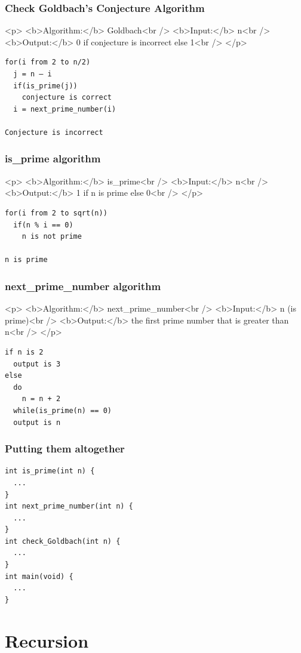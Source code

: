 \documentclass{../c-lecture}
\begin{document}
\begin{frame}
  \frametitle{Check Goldbach’s Conjecture Algorithm}
  <p>
    <b>Algorithm:</b> Goldbach<br />
    <b>Input:</b> n<br />
    <b>Output:</b> 0 if conjecture is incorrect else 1<br />
  </p>
  \begin{verbatim}
for(i from 2 to n/2)
  j = n – i
  if(is_prime(j))
    conjecture is correct
  i = next_prime_number(i)

Conjecture is incorrect
  \end{verbatim}
\end{frame}

\begin{frame}
  \frametitle{is_prime algorithm}
  <p>
    <b>Algorithm:</b> is_prime<br />
    <b>Input:</b> n<br />
    <b>Output:</b> 1 if n is prime else 0<br />
  </p>
  \begin{verbatim}
for(i from 2 to sqrt(n))
  if(n % i == 0)
    n is not prime

n is prime
  \end{verbatim}
\end{frame}

\begin{frame}[fragile]
  \frametitle{next_prime_number algorithm}
  <p>
    <b>Algorithm:</b> next_prime_number<br />
    <b>Input:</b> n (is prime)<br />
    <b>Output:</b> the first prime number that is greater than n<br />
  </p>
  \begin{verbatim}
if n is 2
  output is 3
else
  do
    n = n + 2
  while(is_prime(n) == 0)
  output is n
  \end{verbatim}
\end{frame}

\begin{frame}[fragile]
  \frametitle{Putting them altogether}
  \begin{verbatim}
int is_prime(int n) {
  ...
}
int next_prime_number(int n) {
  ...
}
int check_Goldbach(int n) {
  ...
}
int main(void) {
  ...
}
  \end{verbatim}
\end{frame}

\section{Recursion}
\end{document}
